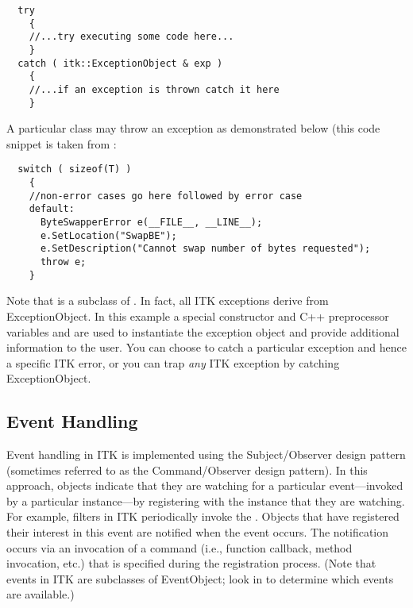 \small
\begin{verbatim}
  try
    {
    //...try executing some code here...
    }
  catch ( itk::ExceptionObject & exp )
    {
    //...if an exception is thrown catch it here
    }
\end{verbatim}
\normalsize

A particular class may throw an exception as demonstrated below (this
code snippet is taken from :

\small
\begin{verbatim}
  switch ( sizeof(T) )
    {
    //non-error cases go here followed by error case
    default:
      ByteSwapperError e(__FILE__, __LINE__);
      e.SetLocation("SwapBE");
      e.SetDescription("Cannot swap number of bytes requested");
      throw e;
    }
\end{verbatim}
\normalsize

Note that  is a subclass of
. In fact, all ITK exceptions derive
from ExceptionObject. In this example a special constructor and C++
preprocessor variables  and  are used to instantiate
the exception object and provide additional information to the user. You can
choose to catch a particular exception and hence a specific ITK error, or you
can trap \emph{any} ITK exception by catching ExceptionObject.


\subsection{Event Handling}
\label{sec:EventHandling}


Event handling in ITK is implemented using the Subject/Observer design
pattern \cite{Gamma1995} (sometimes referred to as the Command/Observer
design pattern). In this approach, objects indicate that they are watching
for a particular event---invoked by a particular instance---by registering
with the instance that they are watching. For example, filters in ITK
periodically invoke the . Objects that have registered
their interest in this event are notified when the event occurs. The
notification occurs via an invocation of a command (i.e., function callback,
method invocation, etc.) that is specified during the registration
process. (Note that events in ITK are subclasses of EventObject; look
in  to determine which events are available.)


